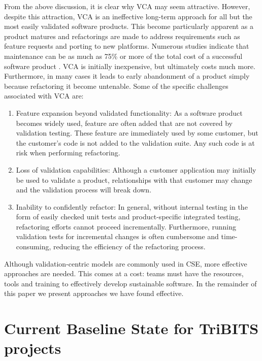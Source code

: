 \documentclass[11pt]{SANDreport}
\begin{document}
From the above discussion, it is clear why VCA may seem attractive.
However, despite this attraction, VCA is an ineffective long-term
approach for all but the most easily validated software products.
This become particularly apparent as a product matures and
refactorings are made to address requirements such as feature requests
and porting to new platforms.  Numerous studies indicate that
maintenance can be as much as 75\% or more of the total cost of a
successful software product {}\cite{CodeComplete2nd04}.  VCA is
initially inexpensive, but ultimately costs much more.  Furthermore,
in many cases it leads to early abandonment of a product simply
because refactoring it become untenable.  Some of the specific
challenges associated with VCA are:

\begin{enumerate}

{}\item Feature expansion beyond validated functionality: As a
software product becomes widely used, feature are often added that are
not covered by validation testing.  These feature are immediately used
by some customer, but the customer's code is not added to the
validation suite.  Any such code is at risk when performing
refactoring.

{}\item Loss of validation capabilities: Although a customer
application may initially be used to validate a product, relationships
with that customer may change and the validation process will break
down.

{}\item Inability to confidently refactor: In general, without
internal testing in the form of easily checked unit tests and
product-specific integrated testing, refactoring efforts cannot
proceed incrementally.  Furthermore, running validation tests for
incremental changes is often cumbersome and time-consuming, reducing
the efficiency of the refactoring process.

\end{enumerate}

Although validation-centric models are commonly used in CSE, more
effective approaches are needed.  This comes at a cost: teams must
have the resources, tools and training to effectively develop
sustainable software.  In the remainder of this paper we present
approaches we have found effective.


%
{}\section{Current Baseline State for TriBITS projects}
\label{sec:tribts_current_state}
%
\end{document}
